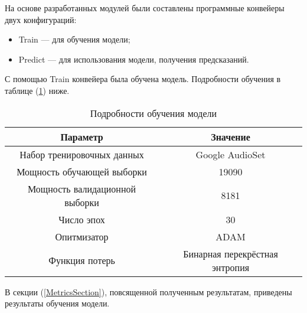 \documentclass[../body.tex]{subfiles}
\begin{document}
На основе разработанных модулей были составлены программные конвейеры двух конфигураций:

\begin{itemize}
	\item Train --- для обучения модели;
	\item Predict --- для использования модели, получения предсказаний.
\end{itemize}

С помощью Train конвейера была обучена модель. Подробности обучения в таблице (\ref{FitParamsTable}) ниже.

\begin{table}[H]
	\centering
	\begin{tabular}{|c|c|}
		\hline
		Параметр & Значение \\
		\hline
		Набор тренировочных данных & Google AudioSet \cite{audioset} \\
		\hline
		Мощность обучающей выборки & 19090 \\
		\hline
		Мощность валидационной выборки & 8181 \\
		\hline
		Число эпох & 30 \\
		\hline
		Опитмизатор & ADAM \cite{adam_optimizer} \\
		\hline
		Функция потерь & Бинарная перекрёстная энтропия \cite{wiki:bin_crossentropy} \\
		\hline
	\end{tabular}
	\caption{Подробности обучения модели}\label{FitParamsTable}
\end{table}

В секции (\ref{MetricsSection}), повсященной полученным результатам,  приведены результаты обучения модели.
\end{document}
